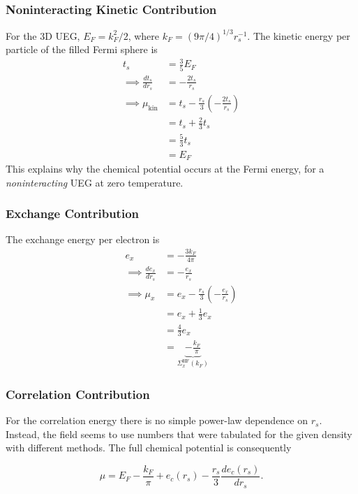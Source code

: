 \subsubsection{Noninteracting Kinetic Contribution}
For the 3D UEG, $E_F = k_F^2/2$, where $k_F=\left(9\pi/4\right)^{1/3}r_s^{-1}$. The kinetic energy per particle of the filled Fermi sphere is
\begin{align}
    t_s
    &=
    \frac{3}{5}E_F\\
\implies    \frac{dt_s}{dr_s}
    &=
    -\frac{2t_s}{r_s}\\
\implies    \mu_{\mathrm{kin}}
    &=
    t_s
    -
    \frac{r_s}{3}
    \left(
    -\frac{2t_s}{r_s}
    \right)
    \\
    &=
    t_s+\frac{2}{3}t_s
    \\
    &=
    \frac{5}{3}t_s\\
&= E_F
\end{align}
This explains why the chemical potential occurs at the Fermi energy, for a \emph{noninteracting} UEG at zero
temperature.
\subsubsection{Exchange Contribution}
The exchange energy per
electron is
\begin{align}
    e_x
    &=
    -\frac{3k_F}{4\pi}\\
\implies 
    \frac{de_x}{dr_s}
    &=
    -\frac{e_x}{r_s}\\
\implies    \mu_x
    &=
    e_x
    -
    \frac{r_s}{3}
    \left(
    -\frac{e_x}{r_s}
    \right)
    \\
    &=
    e_x+\frac{1}{3}e_x
    \\
    &=
    \frac{4}{3}e_x\\
&= \underbrace{-\frac{k_F}{\pi}}_{\Sigma_x^{\mathrm{HF}}(k_F)}
\end{align}
\subsubsection{Correlation Contribution}
For the correlation energy there is no simple power-law dependence
on $r_s$. Instead, the field seems to use numbers that were tabulated for the given density with different methods.
The full chemical potential is consequently

\begin{equation}
    \boxed{
    \mu
    =
    E_F
    -
    \frac{k_F}{\pi}
    +
    e_c(r_s)
    -
    \frac{r_s}{3}
    \frac{de_c(r_s)}{dr_s}
    }.
\end{equation}
